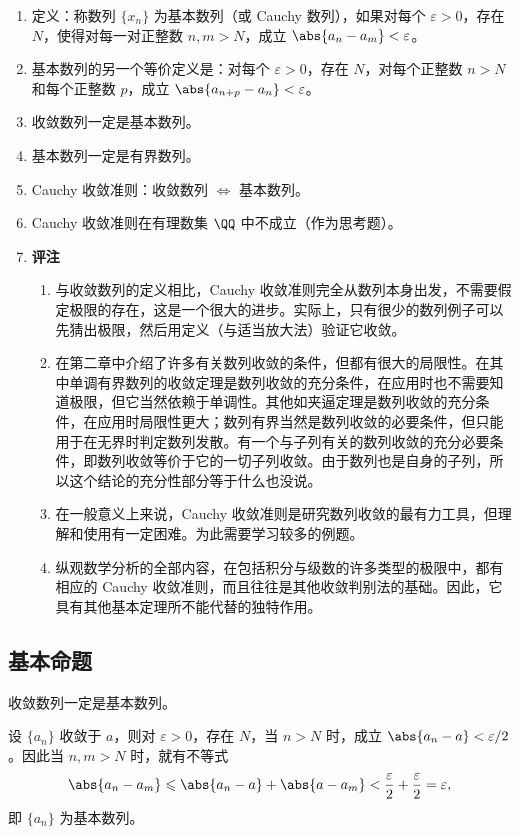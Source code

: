 \begin{enumerate}
  \item 定义：称数列 $\{x_n\}$ 为基本数列（或 Cauchy 数列），如果对每个 $\varepsilon>0$，存在 $N$，使得对每一对正整数 $n,m>N$，成立 $\abs{a_n-a_m}<\varepsilon$。
  \item 基本数列的另一个等价定义是：对每个 $\varepsilon>0$，存在 $N$，对每个正整数 $n>N$ 和每个正整数 $p$，成立 $\abs{a_{n+p}-a_n}<\varepsilon$。
  \item 收敛数列一定是基本数列。
  \item 基本数列一定是有界数列。
  \item Cauchy 收敛准则：收敛数列 $\Longleftrightarrow$ 基本数列。
  \item Cauchy 收敛准则在有理数集 $\QQ$ 中不成立（作为思考题）。
  \item \textbf{评注}
  \begin{enumerate}[label=(\arabic*)]
    \item 与收敛数列的定义相比，Cauchy 收敛准则完全从数列本身出发，不需要假定极限的存在，这是一个很大的进步。实际上，只有很少的数列例子可以先猜出极限，然后用定义（与适当放大法）验证它收敛。
    \item 在第二章中介绍了许多有关数列收敛的条件，但都有很大的局限性。在其中单调有界数列的收敛定理是数列收敛的充分条件，在应用时也不需要知道极限，但它当然依赖于单调性。其他如夹逼定理是数列收敛的充分条件，在应用时局限性更大；数列有界当然是数列收敛的必要条件，但只能用于在无界时判定数列发散。有一个与子列有关的数列收敛的充分必要条件，即数列收敛等价于它的一切子列收敛。由于数列也是自身的子列，所以这个结论的充分性部分等于什么也没说。
    \item 在一般意义上来说，Cauchy 收敛准则是研究数列收敛的最有力工具，但理解和使用有一定困难。为此需要学习较多的例题。
    \item 纵观数学分析的全部内容，在包括积分与级数的许多类型的极限中，都有相应的 Cauchy 收敛准则，而且往往是其他收敛判别法的基础。因此，它具有其他基本定理所不能代替的独特作用。
  \end{enumerate}
\end{enumerate}

\subsection{基本命题}

\begin{xproposition}[3.4.1]
收敛数列一定是基本数列。
\end{xproposition}
\begin{xproof}
设 $\{a_n\}$ 收敛于 $a$，则对 $\varepsilon>0$，存在 $N$，当 $n>N$ 时，成立 $\abs{a_n-a}<\varepsilon/2$。因此当 $n,m>N$ 时，就有不等式
\[
  \abs{a_n-a_m}\leqslant\abs{a_n-a}+\abs{a-a_m}<\frac\varepsilon2+\frac\varepsilon2=\varepsilon,
\]
即 $\{a_n\}$ 为基本数列。
\end{xproof}

